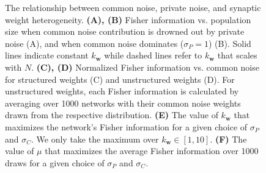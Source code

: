 \documentclass[12pt]{article}
\begin{document}
\begin{figure}[t]
	\centering
	\caption{The relationship between common noise, private noise, and synaptic weight heterogeneity. \textbf{(A), (B)} Fisher information vs. population size when common noise contribution is drowned out by private noise (A), and when common noise dominates ($\sigma_P=1$) (B). Solid lines indicate constant $k_{\mathbf{w}}$ while dashed lines refer to $k_{\mathbf{w}}$ that scales with $N$. \textbf{(C), (D)} Normalized Fisher information vs. common noise for structured weights (C) and unstructured weights (D). For unstructured weights, each Fisher information is calculated by averaging over 1000 networks with their common noise weights drawn from the respective distribution. \textbf{(E)} The value of $k_{\mathbf{w}}$ that maximizes the network's Fisher information for a given choice of $\sigma_P$ and $\sigma_C$. We only take the maximum over $k_{\mathbf{w}} \in [1, 10]$. \textbf{(F)} The value of $\mu$ that maximizes the average Fisher information over 1000 draws for a given choice of $\sigma_P$ and $\sigma_C$.} 
	\label{fig:fisher-quadratic-common}
\end{figure}
	
\end{document}
